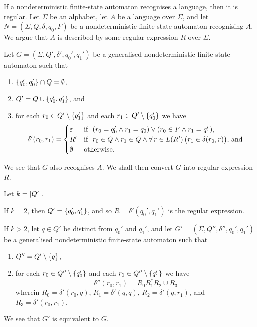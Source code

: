 \Blm
  \label{lem2}
  If a nondeterministic finite-state automaton recognises a language, then it is regular.
\Elm
\Bpr
  Let \(\Sigma\) be an alphabet, let \(A\) be a language over \(\Sigma\), and let \(N = (\Sigma, Q, \delta, q_0, F)\) be
  a nondeterministic finite-state automaton recognising \(A\). We argue that \(A\) is described by some regular
  expression \(R\) over \(\Sigma\).

  Let \(G = (\Sigma, Q', \delta', q_0', q_1')\) be a generalised nondeterministic finite-state automaton such that
  \begin{enumerate}
    \item \(\{q_0', q_0'\} \cap Q = \emptyset\),
    \item \(Q' = Q \cup \{q_0', q_1'\}\), and
    \item for each \(r_0 \in Q' \setminus \{q_1'\}\) and each \(r_1 \in Q' \setminus \{q_0'\}\) we have
    \[
      \delta'(r_0, r_1) = \begin{cases}
        \varepsilon & \text{if }\ (r_0 = q_0' \land r_1 = q_0) \lor (r_0 \in F \land r_1 = q_1'),\\
        R' & \text{if }\ r_0 \in Q \land r_1 \in Q \land \forall \, r \in L(R') \, \big(r_1 \in \delta(r_0, r)\big)
        \text{, and}\\
        \emptyset & \text{otherwise.}
      \end{cases}
    \]
  \end{enumerate}
  We see that \(G\) also recognises \(A\). We shall then convert \(G\) into regular expression \(R\).

  Let \(k = \lvert Q'\rvert\).

  If \(k = 2\), then \(Q' = \{q_0', q_1'\}\), and so \(R = \delta'(q_0', q_1')\) is the regular expression.

  If \(k > 2\), let \(q \in Q'\) be distinct from \(q_0'\) and \(q_1'\), and let \(G' = (\Sigma, Q'', \delta'', q_0',
  q_1')\) be a generalised nondeterministic finite-state automaton such that
  \begin{enumerate}
    \item \(Q'' = Q' \setminus \{q\}\),
    \item for each \(r_0 \in Q'' \setminus \{q_0'\}\) and each \(r_1 \in Q'' \setminus \{q_1'\}\) we have
    \[
      \delta''(r_0, r_1) = R_0 R_1^* R_2 \cup R_3
    \]
    wherein \(R_0 = \delta'(r_0, q)\), \(R_1 = \delta'(q, q)\), \(R_2 = \delta'(q, r_1)\), and \(R_3 = \delta'(r_0,
    r_1)\).
  \end{enumerate}
  We see that \(G'\) is equivalent to \(G\).


